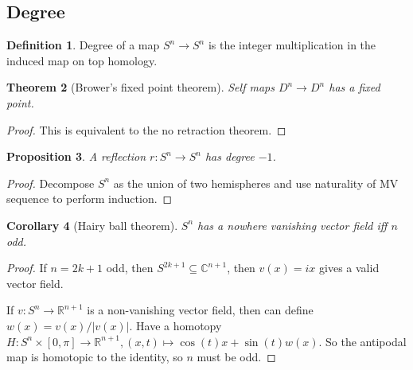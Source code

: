\documentclass{article}
\theoremstyle{definition}
\newtheorem{defn}{Definition}[section]
\theoremstyle{remark}
\theoremstyle{plain}
\newtheorem{thm}[defn]{Theorem}
\newtheorem{prop}[defn]{Proposition}
\newtheorem{crly}[defn]{Corollary}
\newcommand{\RR}{\mathbb{R}}
\newcommand{\CC}{\mathbb{C}}
\begin{document}
\subsection{Degree}
\begin{defn}
    Degree of a map $S^n\to S^n$ is the integer multiplication in the induced map on top homology.
\end{defn}
\begin{thm}[Brower's fixed point theorem]
    Self maps $D^n\to D^n$ has a fixed point.
\end{thm}
\begin{proof}
    This is equivalent to the no retraction theorem.
\end{proof}
\begin{prop}
    A reflection $r:S^n\to S^n$ has degree $-1$.
\end{prop}
\begin{proof}
    Decompose $S^n$ as the union of two hemispheres and use naturality of MV sequence to perform induction.
\end{proof}
\begin{crly}[Hairy ball theorem]
    $S^n$ has a nowhere vanishing vector field iff $n$ odd.
\end{crly}
\begin{proof}
    If $n=2k+1$ odd, then $S^{2k+1}\subseteq \CC^{n+1}$, then $v(x)=ix$ gives a valid vector field.

    If $v:S^n\to \RR^{n+1}$ is a non-vanishing vector field, then can define $w(x)=v(x)/|v(x)|$. Have a homotopy $H:S^n\times[0,\pi]\to \RR^{n+1}, (x,t)\mapsto \cos(t)x+\sin(t)w(x)$. So the antipodal map is homotopic to the identity, so $n$ must be odd.
\end{proof}
\end{document}
